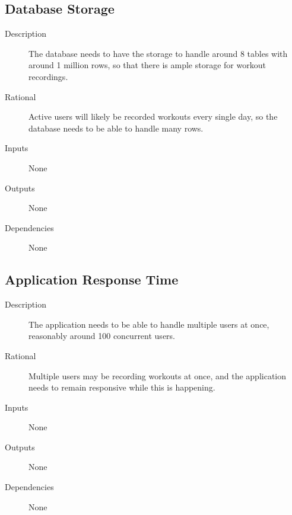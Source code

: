\documentclass[12pt]{article}
\begin{document}
\subsection{Database Storage}
\begin{description}
	\item[Description] The database needs to have the storage to handle around 8 tables with around 1 million rows, so that there is ample storage for workout recordings.
	\item[Rational] Active users will likely be recorded workouts every single day, so the database needs to be able to handle many rows.
	\item[Inputs] None
	\item[Outputs] None
	\item[Dependencies] None
\end{description}

\subsection{Application Response Time}
\begin{description}
	\item[Description] The application needs to be able to handle multiple users at once, reasonably around 100 concurrent users.
	\item[Rational] Multiple users may be recording workouts at once, and the application needs to remain responsive while this is happening.
	\item[Inputs] None
	\item[Outputs] None
	\item[Dependencies] None
\end{description}

\begingroup
\renewcommand{\section}[2]{}
\begin{thebibliography}{10}

\bigskip


\end{thebibliography}
\endgroup
\end{document}
